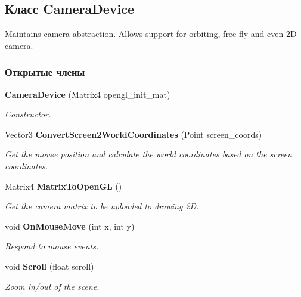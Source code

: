 \subsection{Класс Camera\+Device}
\label{class_win_form_animation2_d_1_1_camera_device}


Maintains camera abstraction. Allows support for orbiting, free fly and even 2D camera.  


\subsubsection*{Открытые члены}
\begin{DoxyCompactItemize}
\item 
{\bf Camera\+Device} (Matrix4 opengl\+\_\+init\+\_\+mat)\label{class_win_form_animation2_d_1_1_camera_device_a59ce26ab0cd14b001e61b428cbbd3993}

\begin{DoxyCompactList}\small\item\em Constructor. \end{DoxyCompactList}\item 
Vector3 {\bf Convert\+Screen2\+World\+Coordinates} (Point screen\+\_\+coords)\label{class_win_form_animation2_d_1_1_camera_device_ac7ad419940551e2a63d36549481ff424}

\begin{DoxyCompactList}\small\item\em Get the mouse position and calculate the world coordinates based on the screen coordinates. \end{DoxyCompactList}\item 
Matrix4 {\bf Matrix\+To\+Open\+GL} ()\label{class_win_form_animation2_d_1_1_camera_device_a708b9cba847463c03fc39aa0e6a8e51b}

\begin{DoxyCompactList}\small\item\em Get the camera matrix to be uploaded to drawing 2D. \end{DoxyCompactList}\item 
void {\bf On\+Mouse\+Move} (int x, int y)\label{class_win_form_animation2_d_1_1_camera_device_a91b06ea84daf2da1d561b318a0b030e3}

\begin{DoxyCompactList}\small\item\em Respond to mouse events. \end{DoxyCompactList}\item 
void {\bf Scroll} (float scroll)\label{class_win_form_animation2_d_1_1_camera_device_ab68f5c2e2b82440495f6735ec5b4a389}

\begin{DoxyCompactList}\small\item\em Zoom in/out of the scene. \end{DoxyCompactList}\end{DoxyCompactItemize}
